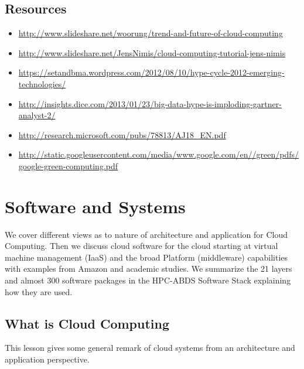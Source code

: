 
\subsection{Resources}\label{resources-1}

\begin{itemize}
\item
  \url{http://www.slideshare.net/woorung/trend-and-future-of-cloud-computing}
\item
  \url{http://www.slideshare.net/JensNimis/cloud-computing-tutorial-jens-nimis}
\item
  \url{https://setandbma.wordpress.com/2012/08/10/hype-cycle-2012-emerging-technologies/}
\item
  \url{http://insights.dice.com/2013/01/23/big-data-hype-is-imploding-gartner-analyst-2/}
\item
  \url{http://research.microsoft.com/pubs/78813/AJ18_EN.pdf}
\item
  \url{http://static.googleusercontent.com/media/www.google.com/en//green/pdfs/google-green-computing.pdf}
\end{itemize}

\section{Software and Systems}

We cover different views as to nature of architecture and application
for Cloud Computing. Then we discuss cloud software for the cloud
starting at virtual machine management (IaaS) and the broad Platform
(middleware) capabilities with examples from Amazon and academic
studies. We summarize the 21 layers and almost 300 software packages in
the HPC-ABDS Software Stack explaining how they are used.



\subsection{What is Cloud Computing}\label{what-is-cloud-computing}

This lesson gives some general remark of cloud systems from an
architecture and application perspective.


